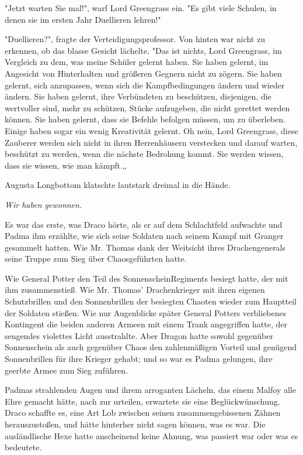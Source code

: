 {"Jetzt warten Sie mal!", warf Lord Greengrass ein. "Es gibt viele Schulen, in denen sie im ersten Jahr Duellieren lehren!"

"Duellieren?", fragte der Verteidigungsprofessor. Von hinten war nicht zu erkennen, ob das blasse Gesicht lächelte. "Das ist nichts, Lord Greengrass, im Vergleich zu dem, was meine Schüler gelernt haben. Sie haben gelernt, im Angesicht von Hinterhalten und größeren Gegnern nicht zu zögern. Sie haben gelernt, sich anzupassen, wenn sich die Kampfbedingungen ändern und wieder ändern. Sie haben gelernt, ihre Verbündeten zu beschützen, diejenigen, die wertvoller sind, mehr zu schützen, Stücke aufzugeben, die nicht gerettet werden können. Sie haben gelernt, dass sie Befehle befolgen müssen, um zu überleben. Einige haben sogar ein wenig Kreativität gelernt. Oh nein, Lord Greengrass, diese Zauberer werden sich nicht in ihren Herrenhäusern verstecken und darauf warten, beschützt zu werden, wenn die nächste Bedrohung kommt. Sie werden wissen, dass sie wissen, wie man kämpft.„

Augusta Longbottom klatschte lautstark dreimal in die Hände.

\emph{Wir haben gewonnen.}

Es war das erste, was Draco hörte, als er auf dem Schlachtfeld aufwachte und Padma ihm erzählte, wie sich seine Soldaten nach seinem Kampf mit Granger gesammelt hatten. Wie Mr. Thomas dank der Weitsicht ihres Drachengenerals seine Truppe zum Sieg über Chaosgeführten hatte.

Wie General Potter den Teil des SonnenscheinRegiments besiegt hatte, der mit ihm zusammenstieß. Wie Mr. Thomas' Drachenkrieger mit ihren eigenen Schutzbrillen und den Sonnenbrillen der besiegten Chaoten wieder zum Hauptteil der Soldaten stießen. Wie nur Augenblicke später General Potters verbliebenes Kontingent die beiden anderen Armeen mit einem Trank angegriffen hatte, der sengendes violettes Licht ausstrahlte. Aber Dragon hatte sowohl gegenüber Sonnenschein als auch gegenüber Chaos den zahlenmäßigen Vorteil und genügend Sonnenbrillen für ihre Krieger gehabt; und so war es Padma gelungen, ihre geerbte Armee zum Sieg zuführen.

Padmas strahlenden Augen und ihrem arroganten Lächeln, das einem Malfoy alle Ehre gemacht hätte, nach zur urteilen, erwartete sie eine Beglückwünschung. Draco schaffte es, eine Art Lob zwischen seinen zusammengebissenen Zähnen herauszustoßen, und hätte hinterher nicht sagen können, was es war. Die ausländlische Hexe hatte anscheinend keine Ahnung, was passiert war oder was es bedeutete.

}
